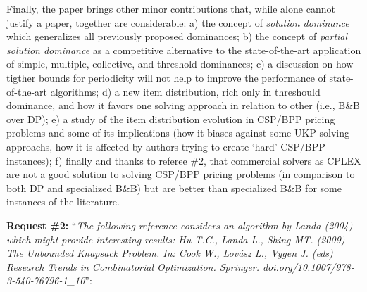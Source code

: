 \documentclass{elsarticle}
\begin{document}
Finally, the paper brings other minor contributions that, while alone cannot justify a paper, together are considerable:
a) the concept of \emph{solution dominance} which generalizes all previously proposed dominances; 
b) the concept of \emph{partial solution dominance} as a competitive alternative to the state-of-the-art application of simple, multiple, collective, and threshold dominances;
c) a discussion on how tigther bounds for periodicity will not help to improve the performance of state-of-the-art algorithms;
d) a new item distribution, rich only in threshould dominance, and how it favors one solving approach in relation to other (i.e., B\&B over DP);
e) a study of the item distribution evolution in CSP/BPP pricing problems and some of its implications (how it biases against some UKP-solving approachs, how it is affected by authors trying to create `hard' CSP/BPP instances);
f) finally and thanks to referee \#2, that commercial solvers as CPLEX are not a good solution to solving CSP/BPP pricing problems (in comparison to both DP and specialized B\&B) but are better than specialized B\&B for some instances of the literature.
\medskip

\textbf{Request \#2:} ``\textit{The following reference considers an algorithm by Landa (2004) which might provide interesting results: Hu T.C., Landa L., Shing MT. (2009) The Unbounded Knapsack Problem. In: Cook W., Lovász L., Vygen J. (eds) Research Trends in Combinatorial Optimization. Springer. doi.org/10.1007/978-3-540-76796-1\_10}'':
\end{document}
